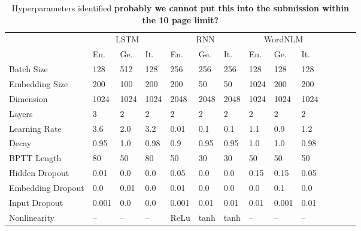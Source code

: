 














\appendix

\begin{table*}[t]
	\begin{tabular}{l|lll|lll|lllllll}
		&  \multicolumn{3}{c}{LSTM} & \multicolumn{3}{|c|}{RNN} & \multicolumn{3}{c}{WordNLM} \\
		       &  En.     &  Ge.    & It.    & En.    &    Ge.   &  It.     &  En.     &   Ge.   &    It. \\  \hline
	Batch Size     &  128   &  512  & 128  & 256  & 256    &  256   &  128   &   128 &  128   \\              
	Embedding Size &  200   &  100  & 200  & 200  & 50     &  50    &  1024  &   200 &  200   \\             
	Dimension      &  1024  &  1024 & 1024 & 2048 & 2048   &  2048  &  1024  &  1024 &  1024  \\  
	Layers         &  3     &  2    & 2    & 2    & 2      &  2     &  2     &  2    &  2     \\   
	Learning Rate  &  3.6   &  2.0  & 3.2  & 0.01 & 0.1    &  0.1   &  1.1   &  0.9  &  1.2   \\ 
	Decay          &  0.95  &  1.0  & 0.98 & 0.9  & 0.95   &  0.95  &  1.0   &  1.0  &  0.98  \\
	BPTT Length    &  80    &  50   & 80   & 50   & 30     &  30    &  50    &  50   &  50    \\
	Hidden Dropout &  0.01  &  0.0  & 0.0  & 0.05 & 0.0    &  0.0   &  0.15  &  0.15 &  0.05  \\   
	Embedding Dropout  & 0.0& 0.01  & 0.0  & 0.01 & 0.0    &  0.0   &  0.0   &  0.1  &  0.0   \\   
	Input Dropout  & 0.001 &  0.0   & 0.0  & 0.001& 0.01   &  0.01  &  0.01  &  0.001&  0.01  \\ 
        Nonlinearity   &   --  & --     & --   & ReLu & tanh   &  tanh  &   --   &  --   &  --    \\                   
\end{tabular}
	\caption{Hyperparameters identified \textbf{probably we cannot put this into the submission within the 10 page limit?}}
\end{table*}






